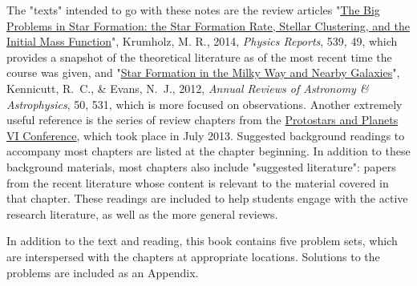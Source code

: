 \documentclass{tex/tufte-book} %
\begin{document}
The "texts" intended to go with these notes are the review articles "\href{http://adsabs.harvard.edu/abs/2014arXiv1402.0867K}{The Big Problems in Star Formation: the Star Formation Rate, Stellar Clustering, and the Initial Mass Function}", Krumholz, M. R., 2014, \textit{Physics Reports}, 539, 49, which provides a snapshot of the theoretical literature as of the most recent time the course was given, and "\href{http://adsabs.harvard.edu/abs/2012ARA\%26A..50..531K}{Star Formation in the Milky Way and Nearby Galaxies}", Kennicutt, R.~C., \& Evans, N.~J., 2012, \textit{Annual Reviews of Astronomy \& Astrophysics}, 50, 531, which is more focused on observations. Another extremely useful reference is the series of review chapters from the \href{http://www.mpia.de/homes/ppvi/}{Protostars and Planets VI Conference}, which took place in July 2013. Suggested background readings to accompany most chapters are listed at the chapter beginning. In addition to these background materials, most chapters also include "suggested literature": papers from the recent literature whose content is relevant to the material covered in that chapter. These readings are included to help students engage with the active research literature, as well as the more general reviews.

In addition to the text and reading, this book contains five problem sets, which are interspersed with the chapters at appropriate locations. Solutions to the problems are included as an Appendix.






\end{document}
